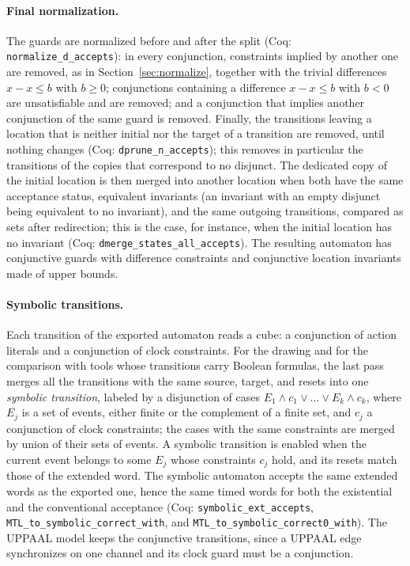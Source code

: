 \paragraph{Final normalization.}
The guards are normalized before and after the split (Coq:
\texttt{normalize\_\allowbreak{}d\_\allowbreak{}accepts}): in every conjunction, constraints
implied by another one are removed, as in Section~\ref{sec:normalize}, together
with the trivial differences $x-x\le b$ with $b\ge0$; conjunctions containing a
difference $x-x\le b$ with $b<0$ are unsatisfiable and are removed; and a
conjunction that implies another conjunction of the same guard is removed.
Finally, the transitions leaving a location that is neither initial nor the
target of a transition are removed, until nothing changes (Coq:
\texttt{dprune\_\allowbreak{}n\_\allowbreak{}accepts}); this removes in particular the
transitions of the copies that correspond to no disjunct.  The dedicated copy
of the initial location is then merged into another location when both have
the same acceptance status, equivalent invariants (an invariant with an empty
disjunct being equivalent to no invariant), and the same outgoing
transitions, compared as sets after redirection; this is the case, for
instance, when the initial location has no invariant (Coq:
\texttt{dmerge\_\allowbreak{}states\_\allowbreak{}all\_\allowbreak{}accepts}).  The resulting
automaton has conjunctive guards with difference constraints and conjunctive
location invariants made of upper bounds.

\paragraph{Symbolic transitions.}
Each transition of the exported automaton reads a cube: a conjunction of
action literals and a conjunction of clock constraints.  For the drawing and
for the comparison with tools whose transitions carry Boolean formulas, the
last pass merges all the transitions with the same source, target, and
resets into one \emph{symbolic transition}, labeled by a disjunction of cases
$E_1\wedge c_1\vee\dots\vee E_k\wedge c_k$, where $E_j$ is a set of events,
either finite or the complement of a finite set, and $c_j$ a conjunction of
clock constraints; the cases with the same constraints are merged by union of
their sets of events.  A symbolic transition is enabled when the current
event belongs to some $E_j$ whose constraints $c_j$ hold, and its resets match
those of the extended word.  The symbolic automaton accepts the same extended
words as the exported one, hence the same timed words for both the
existential and the conventional acceptance (Coq:
\texttt{symbolic\_\allowbreak{}ext\_\allowbreak{}accepts},
\texttt{MTL\_\allowbreak{}to\_\allowbreak{}symbolic\_\allowbreak{}correct\_\allowbreak{}with}, and
\texttt{MTL\_\allowbreak{}to\_\allowbreak{}symbolic\_\allowbreak{}correct0\_\allowbreak{}with}).
The UPPAAL model keeps the conjunctive transitions, since a UPPAAL edge
synchronizes on one channel and its clock guard must be a conjunction.


